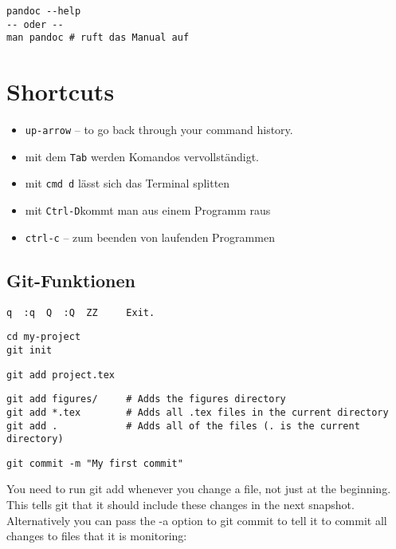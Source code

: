 \documentclass[]{article}
\begin{document}
\begin{verbatim}
pandoc --help
-- oder -- 
man pandoc # ruft das Manual auf
\end{verbatim}

\section{Shortcuts}\label{shortcuts}

\begin{itemize}
\itemsep1pt\parskip0pt
\item
  \texttt{up-arrow} -- to go back through your command history.
\item
  mit dem \texttt{Tab} werden Komandos vervollständigt.
\item
  mit \texttt{cmd d} lässt sich das Terminal splitten
\item
  mit \texttt{Ctrl-D}kommt man aus einem Programm raus
\item
  \texttt{ctrl-c} -- zum beenden von laufenden Programmen
\end{itemize}

\subsection{Git-Funktionen}\label{git-funktionen}

\begin{verbatim}
q  :q  Q  :Q  ZZ     Exit.
\end{verbatim}

\begin{verbatim}
cd my-project
git init
\end{verbatim}

\begin{verbatim}
git add project.tex
\end{verbatim}

\begin{verbatim}
git add figures/     # Adds the figures directory
git add *.tex        # Adds all .tex files in the current directory
git add .            # Adds all of the files (. is the current directory)
\end{verbatim}

\begin{verbatim}
git commit -m "My first commit"
\end{verbatim}

You need to run git add whenever you change a file, not just at the
beginning. This tells git that it should include these changes in the
next snapshot. Alternatively you can pass the -a option to git commit to
tell it to commit all changes to files that it is monitoring:
\end{document}

